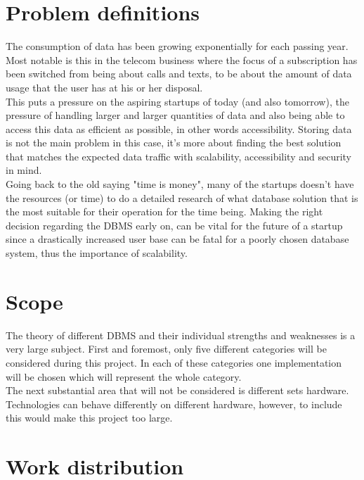 \section{Problem definitions}
The consumption of data has been growing exponentially for each passing year. Most notable is this in the telecom business where the focus of a subscription has been switched from being about calls and texts, to be about the amount of data usage that the user has at his or her disposal. 
\\[0.5cm]
This puts a pressure on the aspiring startups of today (and also tomorrow), the pressure of handling larger and larger quantities of data and also being able to access this data as efficient as possible, in other words accessibility. Storing data is not the main problem in this case, it's more about finding the best solution that matches the expected data traffic with scalability, accessibility and security in mind.
\\[0.5cm]
Going back to the old saying "time is money", many of the startups doesn't have the resources (or time) to do a detailed research of what database solution that is the most suitable for their operation for the time being. Making the right decision regarding the DBMS early on, can be vital for the future of a startup since a drastically increased user base can be fatal for a poorly chosen database system, thus the importance of scalability.


\section{Scope}
The theory of different DBMS and their individual strengths and weaknesses is a very large subject. First and foremost, only five different categories will be considered during this project. In each of these categories one implementation will be chosen which will represent the whole category. 
\\[0.5cm]
The next substantial area that will not be considered is different sets hardware. Technologies can behave differently on different hardware, however, to include this would make this project too large. 

\section{Work distribution}



